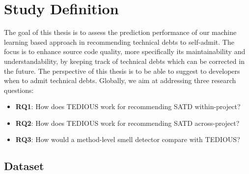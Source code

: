 \section{Study Definition}


The goal of this thesis is to assess the prediction performance of our machine learning based approach in recommending technical debts to self-admit. The focus is to enhance source code quality, more specifically its maintainability and understandability, by keeping track of technical debts which can be corrected in the future. The perspective of this thesis is to be able to suggest to developers when to admit technical debts. Globally, we aim at addressing three research questions:

\begin{itemize}
	\item \textbf{RQ1}: How does \ac{TEDIOUS} work for recommending \ac{SATD} within-project?
	\item \textbf{RQ2}: How does \ac{TEDIOUS} work for recommending \ac{SATD} across-project?
	\item \textbf{RQ3}: How would a method-level smell detector compare with \ac{TEDIOUS}?
\end{itemize}

\subsection{Dataset}


